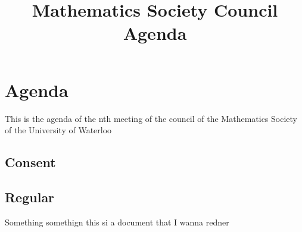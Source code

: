 \documentclass[12pt,letterpaper]{article}
\title{Mathematics Society Council Agenda}
\begin{document}
\section{Agenda}

This is the agenda of the nth meeting of the council of the Mathematics Society of the University of Waterloo


\subsection{Consent}

\subsection{Regular}

Something somethign this si a document that I wanna redner 
\end{document}

